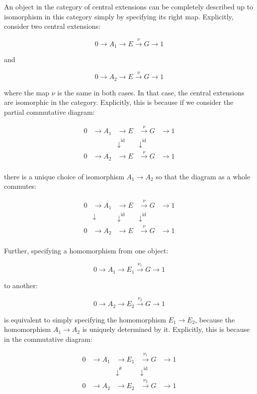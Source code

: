 \documentclass{ucetd}
\begin{document}
An object in the category of central extensions can be completely
described up to isomorphism in this category simply by specifying its
right map. Explicitly, consider two central extensions:

$$0 \to A_1 \to E \stackrel{\nu}{\to} G \to 1$$

and

$$0 \to A_2 \to E \stackrel{\nu}{\to} G \to 1$$

where the map $\nu$ is the same in both cases. In that case, the
central extensions are isomorphic in the category. Explicitly, this is
because if we consider the partial commutative diagram:

$$\begin{array}{rrrrr}
  0 & \to A_1 & \to E & \stackrel{\nu}{\to} G & \to 1 \\
  &  & \downarrow^{\text{id}} & \downarrow^{\text{id}} &\\
  0 & \to A_2 & \to E & \stackrel{\nu}{\to} G & \to 1 \\
\end{array}$$

there is a unique choice of isomorphism $A_1 \to A_2$ so that the
diagram as a whole commutes:

$$\begin{array}{rrrrr}
  0 & \to A_1 & \to E & \stackrel{\nu}{\to} G & \to 1 \\
  & \downarrow & \downarrow^{\text{id}} & \downarrow^{\text{id}} &\\
  0 & \to A_2 & \to E & \stackrel{\nu}{\to} G & \to 1 \\
\end{array}$$

Further, specifying a homomorphism from one object:

$$0 \to A_1 \to E_1 \stackrel{\nu_1}{\to} G \to 1$$

to another:

$$0 \to A_2 \to E_2 \stackrel{\nu_2}{\to} G \to 1$$

is equivalent to simply specifying the homomorphism $E_1 \to E_2$,
because the homomorphism $A_1 \to A_2$ is uniquely determined by
it. Explicitly, this is because in the commutative diagram:

$$\begin{array}{rrrrr}
  0 & \to A_1 & \to E_1 & \stackrel{\nu_1}{\to} G & \to 1 \\
  &  & \downarrow^{\theta} & \downarrow^{\text{id}} &\\
  0 & \to A_2 & \to E_2 & \stackrel{\nu_2}{\to} G & \to 1 \\
\end{array}$$
\end{document}
